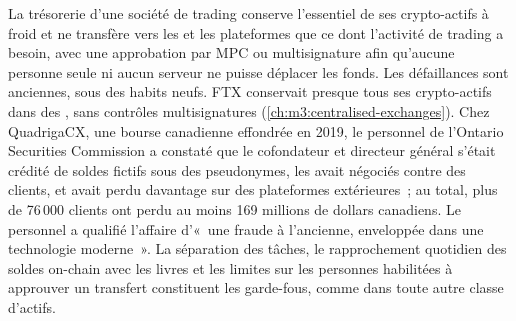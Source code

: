 La trésorerie d'une société de trading conserve l'essentiel de ses crypto-actifs à froid et ne transfère vers les  et les plateformes que ce dont l'activité de trading a besoin, avec une approbation par MPC ou multisignature afin
qu'aucune personne seule ni aucun serveur ne puisse déplacer les fonds. Les défaillances sont anciennes, sous des habits neufs. FTX conservait presque tous ses crypto-actifs dans des , sans contrôles multisignatures
(\cref{ch:m3:centralised-exchanges}). Chez QuadrigaCX, une bourse canadienne effondrée en 2019, le personnel de l'Ontario Securities Commission a constaté que le
cofondateur et directeur général s'était crédité de soldes fictifs sous des pseudonymes, les avait négociés contre des clients, et avait perdu davantage sur des
plateformes extérieures~; au total, plus de 76\,000 clients ont perdu au moins 169 millions de dollars canadiens. Le personnel a qualifié l'affaire d'«~une fraude à l'ancienne, enveloppée dans une technologie
moderne~». La séparation des tâches, le rapprochement quotidien des soldes on-chain avec les livres et les limites sur les personnes habilitées à approuver un transfert constituent les garde-fous, comme
dans toute autre classe d'actifs.

\begin{omfigure}
\centering
{}

\label{fig:m3:the-crypto-trading-business:custody}
\end{omfigure}

